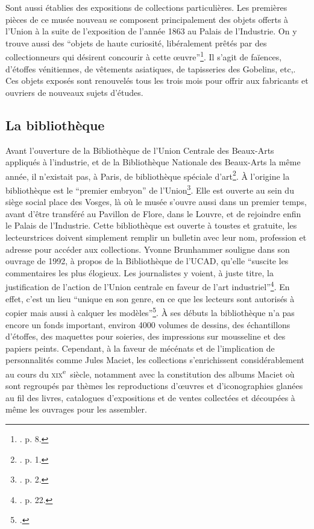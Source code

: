 Sont aussi établies des expositions de collections particulières. Les premières pièces de ce musée nouveau se composent principalement des objets offerts à l'Union à la suite de l'exposition de l'année 1863 au Palais de l'Industrie. On y trouve aussi des \enquote{objets de haute curiosité, libéralement prêtés par des collectionneurs qui désirent concourir à cette œuvre}\footnote{\cite{noauthor_origines_nodate}. p. 8.}. Il s'agit de faïences, d'étoffes vénitiennes, de vêtements asiatiques, de tapisseries des Gobelins, etc,. Ces objets exposés sont renouvelés tous les trois mois pour offrir aux fabricants et ouvriers de nouveaux sujets d'études.

\subsection{La bibliothèque}

Avant l'ouverture de la Bibliothèque de l'Union Centrale des Beaux-Arts appliqués à l'industrie, et de la Bibliothèque Nationale des Beaux-Arts la même année, il n'existait pas, à Paris, de bibliothèque spéciale d'art\footnote{\cite{noauthor__1955}. p. 1.}. À l'origine la bibliothèque est le \enquote{premier embryon} de l'Union\footnote{\cite{noauthor__1991}. p. 2.}. Elle est ouverte au sein du siège social place des Vosges, là où le musée s'ouvre aussi dans un premier temps, avant d'être transféré au Pavillon de Flore, dans le Louvre, et de rejoindre enfin le Palais de l'Industrie. Cette bibliothèque est ouverte à tous\wokisme tes et gratuite, les lecteurs\wokisme trices doivent simplement remplir un bulletin avec leur nom, profession et adresse pour accéder aux collections. Yvonne Brunhammer souligne dans son ouvrage de 1992, à propos de la Bibliothèque de l'UCAD, qu'elle \enquote{suscite les commentaires les plus élogieux. Les journalistes y voient, à juste titre, la justification de l'action de l'Union centrale en faveur de l'art industriel}\footnote{\cite{brunhammer_beau_1992}. p. 22.}. En effet, c'est un lieu \enquote{unique en son genre, en ce que les lecteurs sont autorisés à copier mais aussi à calquer les modèles}\footnote{\cite{noauthor__1874}.}. À ses débuts la bibliothèque n'a pas encore un fonds important, environ 4000 volumes de dessins, des échantillons d'étoffes, des maquettes pour soieries, des impressions sur mousseline et des papiers peints. Cependant, à la faveur de mécénats et de l'implication de personnalités comme Jules Maciet, les collections s'enrichissent considérablement au cours du \textsc{xix}\textsuperscript{e}~siècle, notamment avec la constitution des albums Maciet où sont regroupés par thèmes les reproductions d’œuvres et d'iconographies glanées au fil des livres, catalogues d'expositions et de ventes collectées et découpées à même les ouvrages pour les assembler.

